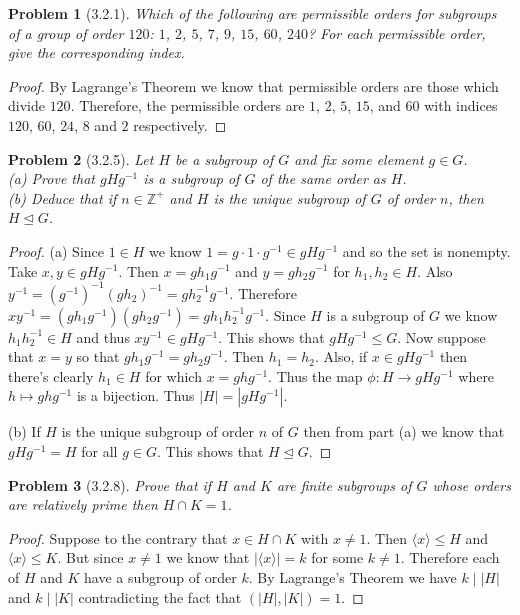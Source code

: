 \documentclass{article}
\newtheorem{problem}{Problem}
\begin{document}
\begin{problem}[3.2.1]
Which of the following are permissible orders for subgroups of a group of order $120$: $1$, $2$, $5$, $7$, $9$, $15$, $60$, $240$? For each permissible order, give the corresponding index.
\end{problem}
\begin{proof}
By Lagrange's Theorem we know that permissible orders are those which divide $120$. Therefore, the permissible orders are $1$, $2$, $5$, $15$, and $60$ with indices $120$, $60$, $24$, $8$ and $2$ respectively.
\end{proof}

\begin{problem}[3.2.5]
Let $H$ be a subgroup of $G$ and fix some element $g \in G$.\\
(a) Prove that $g H g^{-1}$ is a subgroup of $G$ of the same order as $H$.\\
(b) Deduce that if $n \in \mathbb{Z}^+$ and $H$ is the unique subgroup of $G$ of order $n$, then $H \unlhd G$.
\end{problem}
\begin{proof}
(a) Since $1 \in H$ we know $1 = g \cdot 1 \cdot g^{-1} \in gHg^{-1}$ and so the set is nonempty. Take $x,y \in gHg^{-1}$. Then $x = gh_1g^{-1}$ and $y = gh_2g^{-1}$ for $h_1, h_2 \in H$. Also $y^{-1} = (g^{-1})^{-1}(gh_2)^{-1} = gh_2^{-1}g^{-1}$. Therefore $xy^{-1} = (gh_1g^{-1})(gh_2g^{-1}) = gh_1h_2^{-1}g^{-1}$. Since $H$ is a subgroup of $G$ we know $h_1h_2^{-1} \in H$ and thus $xy^{-1} \in gHg^{-1}$. This shows that $gHg^{-1} \leq G$. Now suppose that $x = y$ so that $gh_1g^{-1} = gh_2g^{-1}$. Then $h_1 = h_2$. Also, if $x \in gHg^{-1}$ then there's clearly $h_1 \in H$ for which $x = ghg^{-1}$. Thus the map $\phi : H \to gHg^{-1}$ where $h \mapsto ghg^{-1}$ is a bijection. Thus $|H| = |gHg^{-1}|$.

(b) If $H$ is the unique subgroup of order $n$ of $G$ then from part (a) we know that $gHg^{-1} = H$ for all $g \in G$. This shows that $H \unlhd G$.
\end{proof}

\begin{problem}[3.2.8]
Prove that if $H$ and $K$ are finite subgroups of $G$ whose orders are relatively prime then $H \cap K = 1$.
\end{problem}
\begin{proof}
Suppose to the contrary that $x \in H \cap K$ with $x \neq 1$. Then $\langle x \rangle \leq H$ and $\langle x \rangle \leq K$. But since $x \neq 1$ we know that $|\langle x \rangle| = k$ for some $k \neq 1$. Therefore each of $H$ and $K$ have a subgroup of order $k$. By Lagrange's Theorem we have $k \mid |H|$ and $k \mid |K|$ contradicting the fact that $(|H|, |K|) = 1$.
\end{proof}
\end{document}
